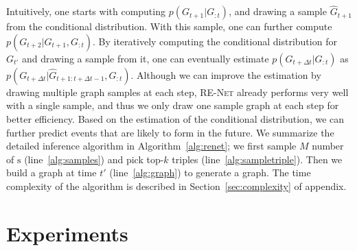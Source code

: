 \documentclass[11pt,a4paper]{article}
\newcommand{\prob}{p}
\newcommand{\calE}{G}
\newcommand{\method}{\textsc{RE-Net}\xspace}
\newcommand{\bs}{\mathrm{s}}
\begin{document}
Intuitively, one starts with computing {\small $\prob(\calE_{t+1}|\calE_{:t})$}, and drawing a sample $\hat{\calE}_{t+1}$ from the conditional distribution. With this sample, one can further compute {\small $\prob(\calE_{t+2}|\hat{\calE}_{t+1},\calE_{:t})$}. By iteratively computing the conditional distribution for $\calE_{t'}$ and drawing a sample from it, one can eventually estimate {\small $\prob (\calE_{t+\Delta t}|\calE_{:t})$} as {\small $\prob(\calE_{t+\Delta t}|\hat{\calE}_{t+1:t+\Delta t-1},\calE_{:t})$}. 
Although we can improve the estimation by drawing multiple graph samples at each step, \method already performs very well with a single sample, and thus we only draw one sample graph at each step for better efficiency. 
Based on the estimation of the conditional distribution, we can further predict events that are likely to form in the future. 
We summarize the detailed inference algorithm in Algorithm~\ref{alg:renet}; we first sample $M$ number of $\bs$ (line~\ref{alg:samples}) and pick top-$k$ triples (line~\ref{alg:sampletriple}). Then we build a graph at time $t'$ (line~\ref{alg:graph}) to generate a graph. The time complexity of the algorithm is described in Section~\ref{sec:complexity} of appendix.







\section{Experiments}

\end{document}
